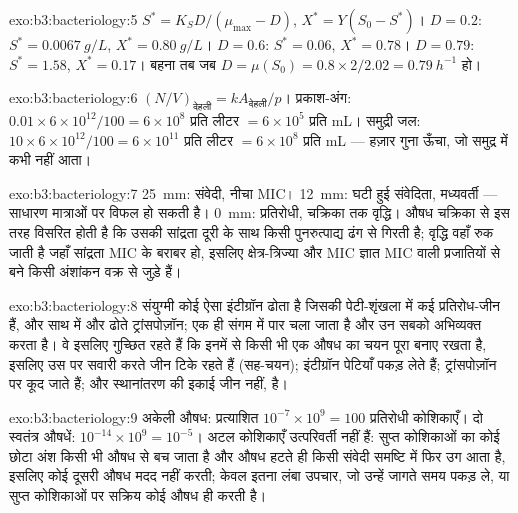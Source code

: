 \begin{solution}{exo:b3:bacteriology:5}
$S^{*} = K_{S}D/(\mu_{\max} - D)$, $X^{*} = Y(S_{0} - S^{*})$। $D = 0.2$:
$S^{*} = \qty{0.0067}{g/L}$, $X^{*} = \qty{0.80}{g/L}$। $D = 0.6$:
$S^{*} = 0.06$, $X^{*} = 0.78$। $D = 0.79$: $S^{*} = 1.58$, $X^{*} = 0.17$।
बहना तब जब $D = \mu(S_{0}) = 0.8\times 2/2.02 = \qty{0.79}{h^{-1}}$ हो।
\end{solution}

\begin{solution}{exo:b3:bacteriology:6}
$(N/V)_{\text{देहली}} = kA_{\text{देहली}}/p$। प्रकाश-अंग: $0.01\times
6\times 10^{12}/100 = 6\times 10^{8}$ प्रति लीटर $= 6\times 10^{5}$ प्रति
mL। समुद्री जल: $10\times 6\times 10^{12}/100 = 6\times 10^{11}$ प्रति लीटर
$= 6\times 10^{8}$ प्रति mL --- हज़ार गुना ऊँचा, जो समुद्र में कभी
नहीं आता।
\end{solution}

\begin{solution}{exo:b3:bacteriology:7}
\qty{25}{mm}: संवेदी, नीचा MIC। \qty{12}{mm}: घटी हुई संवेदिता,
मध्यवर्ती --- साधारण मात्राओं पर विफल हो सकती है। \qty{0}{mm}: प्रतिरोधी,
चक्रिका तक वृद्धि। औषध चक्रिका से इस तरह विसरित होती है कि उसकी
सांद्रता दूरी के साथ किसी पुनरुत्पाद्य ढंग से गिरती है; वृद्धि वहाँ रुक
जाती है जहाँ सांद्रता MIC के बराबर हो, इसलिए क्षेत्र-त्रिज्या और MIC
ज्ञात MIC वाली प्रजातियों से बने किसी अंशांकन वक्र से जुड़े हैं।
\end{solution}

\begin{solution}{exo:b3:bacteriology:8}
संयुग्मी  कोई ऐसा इंटीग्रॉन ढोता है जिसकी पेटी-शृंखला में कई
प्रतिरोध-जीन हैं, और साथ में और ढोते ट्रांसपोज़ॉन;  एक ही
संगम में पार चला जाता है और उन सबको अभिव्यक्त करता है। वे इसलिए गुच्छित
रहते हैं कि इनमें से किसी भी एक औषध का चयन पूरा  बनाए रखता
है, इसलिए उस पर सवारी करते जीन टिके रहते हैं (सह-चयन); इंटीग्रॉन
पेटियाँ पकड़ लेते हैं; ट्रांसपोज़ॉन  पर कूद जाते हैं; और
स्थानांतरण की इकाई जीन नहीं,  है।
\end{solution}

\begin{solution}{exo:b3:bacteriology:9}
अकेली औषध: प्रत्याशित $10^{-7}\times 10^{9} = 100$ प्रतिरोधी कोशिकाएँ। दो
स्वतंत्र औषधें: $10^{-14}\times 10^{9} = 10^{-5}$। अटल कोशिकाएँ
उत्परिवर्ती नहीं हैं: सुप्त कोशिकाओं का कोई छोटा अंश किसी भी औषध से बच
जाता है और औषध हटते ही किसी संवेदी समष्टि में फिर उग आता है, इसलिए कोई
दूसरी औषध मदद नहीं करती; केवल इतना लंबा उपचार, जो उन्हें जागते समय
पकड़ ले, या सुप्त कोशिकाओं पर सक्रिय कोई औषध ही करती है।
\end{solution}

